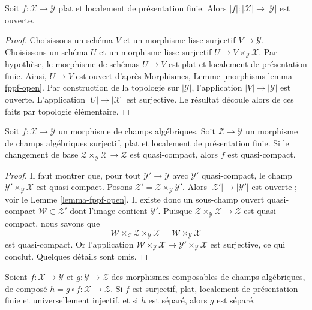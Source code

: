 \begin{lemma}
\label{lemma-fppf-open}
Soit $f : \mathcal{X} \to \mathcal{Y}$ plat et localement de présentation
finie. Alors $|f| : |\mathcal{X}| \to |\mathcal{Y}|$ est ouverte.
\end{lemma}

\begin{proof}
Choisissons un schéma $V$ et un morphisme lisse surjectif
$V \to \mathcal{Y}$. Choisissons un schéma $U$ et un morphisme lisse
surjectif $U \to V \times_\mathcal{Y} \mathcal{X}$. Par hypothèse, le
morphisme de schémas $U \to V$ est plat et localement de présentation finie.
Ainsi, $U \to V$ est ouvert d'après Morphismes, Lemme
\ref{morphisms-lemma-fppf-open}. Par construction de la topologie sur
$|\mathcal{Y}|$, l'application $|V| \to |\mathcal{Y}|$ est ouverte.
L'application $|U| \to |\mathcal{X}|$ est surjective. Le résultat découle
alors de ces faits par topologie élémentaire.
\end{proof}

\begin{lemma}
\label{lemma-descent-quasi-compact}
Soit $f : \mathcal{X} \to \mathcal{Y}$ un morphisme de champs algébriques.
Soit $\mathcal{Z} \to \mathcal{Y}$ un morphisme de champs algébriques
surjectif, plat et localement de présentation finie. Si le changement de base
$\mathcal{Z} \times_\mathcal{Y} \mathcal{X} \to \mathcal{Z}$
est quasi-compact, alors $f$ est quasi-compact.
\end{lemma}

\begin{proof}
Il faut montrer que, pour tout $\mathcal{Y}' \to \mathcal{Y}$ avec
$\mathcal{Y}'$ quasi-compact, le champ
$\mathcal{Y}' \times_\mathcal{Y} \mathcal{X}$ est quasi-compact. Posons
$\mathcal{Z}' = \mathcal{Z} \times_\mathcal{Y} \mathcal{Y}'$. Alors
$|\mathcal{Z}'| \to |\mathcal{Y}'|$ est ouverte ; voir le
Lemme \ref{lemma-fppf-open}. Il existe donc un sous-champ ouvert quasi-compact
$\mathcal{W} \subset \mathcal{Z}'$ dont l'image contient
$\mathcal{Y}'$. Puisque
$\mathcal{Z} \times_\mathcal{Y} \mathcal{X} \to \mathcal{Z}$
est quasi-compact, nous savons que
$$
\mathcal{W} \times_\mathcal{Z} \mathcal{Z} \times_\mathcal{Y} \mathcal{X} =
\mathcal{W} \times_\mathcal{Y} \mathcal{X}
$$
est quasi-compact. Or l'application
$\mathcal{W} \times_\mathcal{Y} \mathcal{X} \to
\mathcal{Y}' \times_\mathcal{Y} \mathcal{X}$
est surjective, ce qui conclut. Quelques détails sont omis.
\end{proof}

\begin{lemma}
\label{lemma-check-separated-on-ui-cover}
Soient $f : \mathcal{X} \to \mathcal{Y}$ et
$g : \mathcal{Y} \to \mathcal{Z}$ des morphismes composables de champs
algébriques, de composé
$h = g \circ f : \mathcal{X} \to \mathcal{Z}$.
Si $f$ est surjectif, plat, localement de présentation finie et
universellement injectif, et si $h$ est séparé, alors $g$ est séparé.
\end{lemma}

